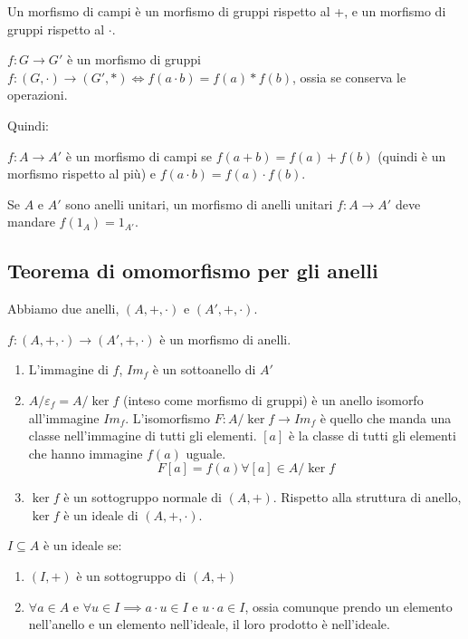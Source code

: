 Un morfismo di campi \`e un morfismo di gruppi rispetto al +, e un morfismo di gruppi rispetto al $\cdot$.

$f : G \to G'$ \`e un morfismo di gruppi $f : (G, \cdot) \to (G', \ast) \iff f(a \cdot b) = f(a) \ast f(b)$, ossia se conserva le operazioni.

Quindi:

$f : A \to A'$ \`e un morfismo di campi se $f(a + b) = f(a) + f(b)$ (quindi \`e un morfismo rispetto al pi\`u) e $f(a \cdot b) = f(a) \cdot f(b)$.

Se $A$ e $A'$ sono anelli unitari, un morfismo di anelli unitari $f : A \to A'$ deve mandare $f(1_A) = 1_{A'}$.

\subsection{Teorema di omomorfismo per gli anelli}

Abbiamo due anelli, $(A, +, \cdot)$ e $(A', +, \cdot)$.

$f : (A, +, \cdot) \to (A', +, \cdot)$ \`e un morfismo di anelli.

\begin{enumerate}
    \item L'immagine di $f$, $Im_f$ \`e un sottoanello di $A'$
    \item $A / \varepsilon_f = A / \ker f$ (inteso come morfismo di gruppi) \`e un anello isomorfo all'immagine $Im_f$. L'isomorfismo $F : A / \ker f \to Im_f$ \`e quello che manda una classe nell'immagine di tutti gli elementi. $[a]$ \`e la classe di tutti gli elementi che hanno immagine $f(a)$ uguale.
    \[
    F[a] = f(a) \forall [a] \in A / \ker f
    \]
    \item $\ker f$ \`e un sottogruppo normale di $(A, +)$. Rispetto alla struttura di anello, $\ker f$ \`e un ideale di $(A, +, \cdot)$.
\end{enumerate}

\begin{defn}
$I \subseteq A$ \`e un ideale se:
\begin{enumerate}
    \item $(I, +)$ \`e un sottogruppo di $(A, +)$
    \item $\forall a \in A$ e $\forall u \in I \implies a \cdot u \in I$ e $u \cdot a \in I$, ossia comunque prendo un elemento nell'anello e un elemento nell'ideale, il loro prodotto \`e nell'ideale.
\end{enumerate}
\end{defn}


